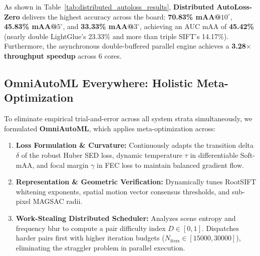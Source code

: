 \documentclass[10pt,twocolumn,letterpaper]{article}
\begin{document}
\begin{table}[h]
\centering
\caption{\textbf{Distributed AutoLoss-Zero GradNorm Benchmark across 24 Evaluation Pairs.}}
\label{tab:distributed_autoloss_results}
\end{table}

As shown in Table~\ref{tab:distributed_autoloss_results}, \textbf{Distributed AutoLoss-Zero} delivers the highest accuracy across the board: \textbf{70.83\% mAA@$10^\circ$}, \textbf{45.83\% mAA@$5^\circ$}, and \textbf{33.33\% mAA@$3^\circ$}, achieving an AUC mAA of \textbf{45.42\%} (nearly double LightGlue's 23.33\% and more than triple SIFT's 14.17\%). Furthermore, the asynchronous double-buffered parallel engine achieves a \textbf{3.28$\times$ throughput speedup} across 6 cores.

\subsection{OmniAutoML Everywhere: Holistic Meta-Optimization}
To eliminate empirical trial-and-error across all system strata simultaneously, we formulated \textbf{OmniAutoML}, which applies meta-optimization across:
\begin{enumerate}
    \item \textbf{Loss Formulation \& Curvature:} Continuously adapts the transition delta $\delta$ of the robust Huber SED loss, dynamic temperature $\tau$ in differentiable Soft-mAA, and focal margin $\gamma$ in FEC loss to maintain balanced gradient flow.
    \item \textbf{Representation \& Geometric Verification:} Dynamically tunes RootSIFT whitening exponents, spatial motion vector consensus thresholds, and sub-pixel MAGSAC radii.
    \item \textbf{Work-Stealing Distributed Scheduler:} Analyzes scene entropy and frequency blur to compute a pair difficulty index $D \in [0, 1]$. Dispatches harder pairs first with higher iteration budgets ($N_{\text{iters}} \in [15000, 30000]$), eliminating the straggler problem in parallel execution.
\end{enumerate}
\end{document}
